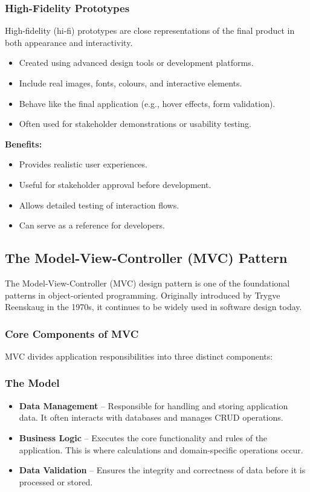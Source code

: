 \documentclass{article}
\begin{document}
\subsubsection{High-Fidelity Prototypes}

High-fidelity (hi-fi) prototypes are close representations of the final product in both appearance and interactivity.

\begin{itemize}
    \item Created using advanced design tools or development platforms.
    \item Include real images, fonts, colours, and interactive elements.
    \item Behave like the final application (e.g., hover effects, form validation).
    \item Often used for stakeholder demonstrations or usability testing.
\end{itemize}

\textbf{Benefits:}
\begin{itemize}
    \item Provides realistic user experiences.
    \item Useful for stakeholder approval before development.
    \item Allows detailed testing of interaction flows.
    \item Can serve as a reference for developers.
\end{itemize}




\subsection{The Model-View-Controller (MVC) Pattern}

The Model-View-Controller (MVC) design pattern is one of the foundational patterns in object-oriented programming. Originally introduced by Trygve Reenskaug in the 1970s, it continues to be widely used in software design today.

\subsubsection{Core Components of MVC}
MVC divides application responsibilities into three distinct components:

\subsubsection*{The Model}
\begin{itemize}
\item \textbf{Data Management} – Responsible for handling and storing application data. It often interacts with databases and manages CRUD operations.
\item \textbf{Business Logic} – Executes the core functionality and rules of the application. This is where calculations and domain-specific operations occur.
\item \textbf{Data Validation} – Ensures the integrity and correctness of data before it is processed or stored.
\end{itemize}
\end{document}
